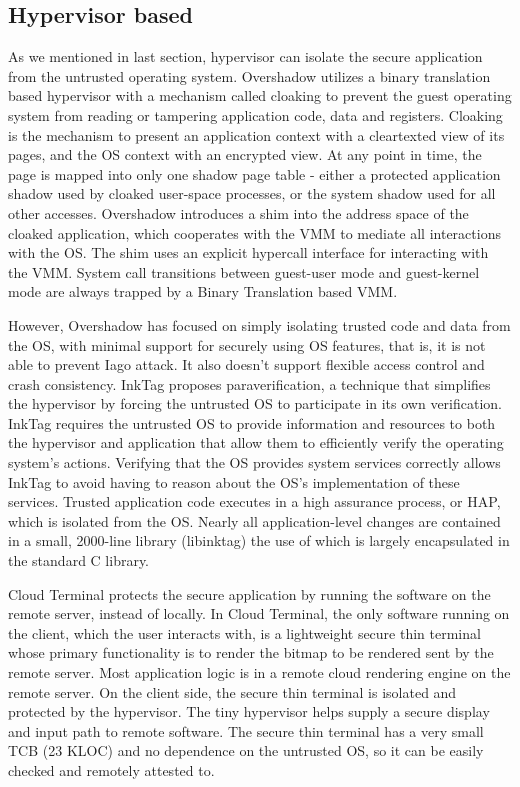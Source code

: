 \subsection{Hypervisor based}

As we mentioned in last section, hypervisor can isolate the secure application
from the untrusted operating system. Overshadow \cite{Overshadow} utilizes a
binary translation based hypervisor with a mechanism called cloaking to prevent
the guest operating system from reading or tampering application code, data and
registers.  Cloaking is the mechanism to present an application context with a
cleartexted view of its pages, and the OS context with an encrypted view. At
any point in time, the page is mapped into only one shadow page table - either
a protected application shadow used by cloaked user-space processes, or the
system shadow used for all other accesses. Overshadow introduces a shim into
the address space of the cloaked application, which cooperates with the VMM to
mediate all interactions with the OS. The shim uses an explicit hypercall
interface for interacting with the VMM. System call transitions between
guest-user mode and guest-kernel mode are always trapped by a Binary
Translation based VMM.

However, Overshadow has focused on simply isolating trusted code and data from
the OS, with minimal support for securely using OS features, that is, it is not
able to prevent Iago attack. It also doesn't support flexible access control
and crash consistency. InkTag proposes paraverification, a technique that
simplifies the hypervisor by forcing the untrusted OS to participate in its own
verification. InkTag requires the untrusted OS to provide information and
resources to both the hypervisor and application that allow them to efficiently
verify the operating system's actions. Verifying that the OS provides system
services correctly allows InkTag to avoid having to reason about the OS's
implementation of these services. Trusted application code executes in a high
assurance process, or HAP, which is isolated from the OS. Nearly all
application-level changes are contained in a small, 2000-line library
(libinktag) the use of which is largely encapsulated in the standard C library.

Cloud Terminal \cite{CloudTerminal} protects the secure application by running
the software on the remote server, instead of locally. In Cloud Terminal, the
only software running on the client, which the user interacts with, is a
lightweight secure thin terminal whose primary functionality is to render the
bitmap to be rendered sent by the remote server. Most application logic is in a
remote cloud rendering engine on the remote server. On the client side, the
secure thin terminal is isolated and protected by the hypervisor. The tiny
hypervisor helps supply a secure display and input path to remote software. The
secure thin terminal has a very small TCB (23 KLOC) and no dependence on the
untrusted OS, so it can be easily checked and remotely attested to.

